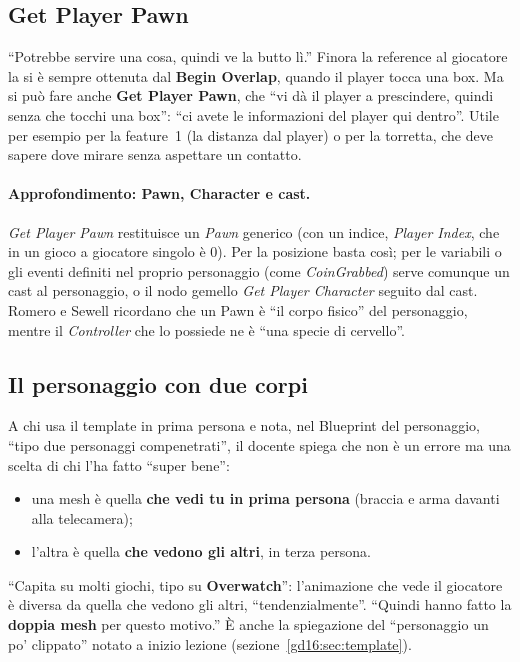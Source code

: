 \subsection{Get Player Pawn}

``Potrebbe servire una cosa, quindi ve la butto lì.'' Finora la reference al
giocatore la si è sempre ottenuta dal \textbf{Begin Overlap}, quando il player
tocca una box. Ma si può fare anche \textbf{Get Player Pawn}, che ``vi dà il player
a prescindere, quindi senza che tocchi una box'': ``ci avete le informazioni del
player qui dentro''. Utile per esempio per la feature~1 (la distanza dal player)
o per la torretta, che deve sapere dove mirare senza aspettare un contatto.

\paragraph{Approfondimento: Pawn, Character e cast.} \emph{Get Player Pawn}
restituisce un \emph{Pawn} generico (con un indice, \emph{Player Index}, che in
un gioco a giocatore singolo è 0). Per la posizione basta così; per le variabili
o gli eventi definiti nel proprio personaggio (come \emph{CoinGrabbed}) serve
comunque un cast al personaggio, o il nodo gemello \emph{Get Player Character}
seguito dal cast. Romero e Sewell ricordano che un Pawn è ``il corpo fisico'' del
personaggio, mentre il \emph{Controller} che lo possiede ne è ``una specie di
cervello''.

\subsection{Il personaggio con due corpi}

A chi usa il template in prima persona e nota, nel Blueprint del personaggio,
``tipo due personaggi compenetrati'', il docente spiega che non è un errore ma
una scelta di chi l'ha fatto ``super bene'':
\begin{itemize}
  \item una mesh è quella \textbf{che vedi tu in prima persona} (braccia e arma
        davanti alla telecamera);
  \item l'altra è quella \textbf{che vedono gli altri}, in terza persona.
\end{itemize}
``Capita su molti giochi, tipo su \textbf{Overwatch}'': l'animazione che vede il
giocatore è diversa da quella che vedono gli altri, ``tendenzialmente''. ``Quindi
hanno fatto la \textbf{doppia mesh} per questo motivo.'' È anche la spiegazione
del ``personaggio un po' clippato'' notato a inizio lezione
(sezione~\ref{gd16:sec:template}).

